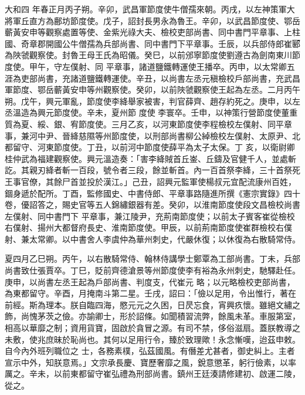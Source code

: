
\begin{pinyinscope}

 大和四
 年春正月丙子朔。辛卯，武昌軍節度使牛僧孺來朝。丙戌，以左神策軍大將軍丘直方為鄜坊節度使。戊子，詔封長男永為魯王。辛卯，以武昌節度使、鄂岳蘄黃安申等觀察處置等使、金紫光祿大夫、檢校吏部尚書、同中書門平章事、上柱國、奇章郡開國公牛僧孺為兵部尚書、同中書門下平章事。壬辰，以兵部侍郎崔郾為陜虢觀察使。封魯王母王氏為昭儀。癸巳，以前邠寧節度使劉遵古為劍南東川節度使。甲午，守左僕射、同
 平章事，諸道鹽鐵轉運使王播卒。丙申，以太常卿五涯為吏部尚書，充諸道鹽鐵轉運使。辛丑，以尚書左丞元稹檢校戶部尚書，充武昌軍節度、鄂岳蘄黃安申等州觀察使。癸卯，以前陜虢觀察使王起為左丞。二月丙午朔。戊午，興元軍亂，節度使李絳舉家被害，判官薛齊、趙存約死之。庚申，以左丞溫造為興元節度使。辛未，夏州節
 度使
 李寰卒。壬申，以神策行營節度使董重質為夏、綏、銀、宥節度使。三月乙亥，以河東節度使李程檢校左僕射、同平章事，兼河中尹、晉絳慈隰等州節度使，以刑部尚書柳公綽檢校左僕射、太原尹、北都留守、河東節度使。丁丑，以前河中節度使薛平為太子太保。丁
 亥，以衛尉卿桂仲武為福建觀察使。興元溫造奏：「害李絳賊首丘崟、丘鑄及官健千人，並處斬訖。其親刃絳者斬一百段，號令者三段，餘並斬首。內一百首祭李絳，三十首祭死王事官僚，其餘尸首並投於漢江。」己丑，詔興元監軍使楊叔元宜配流康州百姓，錮身遞於配所。丁酉，監修國史、中書侍郎、平章事路隨進所撰《憲宗實錄》四十卷，優詔答之，賜史官等五人錦繡銀器有差。癸卯，以淮南節度使段文昌檢校尚書左僕射、同中書門下
 平章事，兼江陵尹，充荊南節度使；以前太子賓客崔從檢校右僕射、揚州大都督府長史、淮南節度使。甲辰，以前荊南節度使崔群檢校右僕射、兼太常卿。以中書舍人李虞仲為華州刺史，代嚴休復；以休復為右散騎常侍。



 夏四月乙巳朔。丙午，以右散騎常侍、翰林侍講學士鄭覃為工部尚書。丁未，兵部尚書致仕張賈卒。丁巳，貶前齊德滄景等州節度使李有裕為永州刺史，馳驛赴任。庚申，以尚書左丞王起為戶部尚書、判度支，代崔元
 略；以元略檢校吏部尚書，為東都留守。辛酉，月掩南斗第二星。壬戌，詔曰：「儉以足用，令出惟行，著在前經。斯為理本。朕自臨四海，愍元元之久困，日昃忘食，宵興疚懷。雖絕文繡之飾，尚愧茅茨之儉。亦諭卿士，形於詔條。如聞積習流弊，餘風未革。車服第室，相高以華靡之制；資用貨寶，固啟於貪冒之源。有司不禁，侈俗滋扇。蓋朕教導之未敷，使兆庶昧於恥尚也。其何以足用行令，臻於致理歟！永念慚嘆，迨茲申敕。自今內外班列職位之
 士，各務素樸，弘茲國風。有僭差尤甚者，御史糾上。主者宣示中外，知朕意焉。」文宗承長慶、寶歷奢靡之風，銳意懲革，躬行儉素，以率厲之。辛未，以前東都留守崔弘禮為刑部尚書。鎮州王廷湊請修建初、啟運二陵，從之。




\end{pinyinscope}
